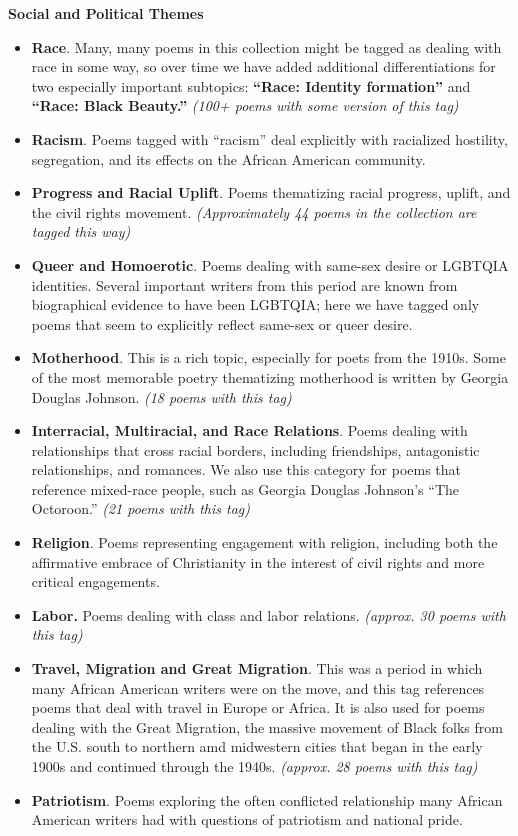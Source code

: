 \documentclass[
  letterpaper,
  DIV=11,
  numbers=noendperiod]{scrartcl}
\providecommand{\tightlist}{%
  \setlength{\itemsep}{0pt}\setlength{\parskip}{0pt}}\usepackage{longtable,booktabs,array}
\begin{document}
\textbf{Social and Political Themes}

\begin{itemize}
\tightlist
\item
  \textbf{Race}. Many, many poems in this collection might be tagged as
  dealing with race in some way, so over time we have added additional
  differentiations for two especially important subtopics:
  \textbf{``Race: Identity formation''} and \textbf{``Race: Black
  Beauty.''} \emph{(100+ poems with some version of this tag)}
\item
  \textbf{Racism}. Poems tagged with ``racism'' deal explicitly with
  racialized hostility, segregation, and its effects on the African
  American community.
\item
  \textbf{Progress and Racial Uplift}. Poems thematizing racial
  progress, uplift, and the civil rights movement. \emph{(Approximately
  44 poems in the collection are tagged this way)}
\item
  \textbf{Queer and Homoerotic}. Poems dealing with same-sex desire or
  LGBTQIA identities. Several important writers from this period are
  known from biographical evidence to have been LGBTQIA; here we have
  tagged only poems that seem to explicitly reflect same-sex or queer
  desire.
\item
  \textbf{Motherhood}. This is a rich topic, especially for poets from
  the 1910s. Some of the most memorable poetry thematizing motherhood is
  written by Georgia Douglas Johnson. \emph{(18 poems with this tag)}
\item
  \textbf{Interracial, Multiracial, and Race Relations}. Poems dealing
  with relationships that cross racial borders, including friendships,
  antagonistic relationships, and romances. We also use this category
  for poems that reference mixed-race people, such as Georgia Douglas
  Johnson's ``The Octoroon.'' \emph{(21 poems with this tag)}
\item
  \textbf{Religion}. Poems representing engagement with religion,
  including both the affirmative embrace of Christianity in the interest
  of civil rights and more critical engagements.
\item
  \textbf{Labor. }Poems dealing with class and labor relations.
  \emph{(approx. 30 poems with this tag)}
\item
  \textbf{Travel, Migration and Great Migration}. This was a period in
  which many African American writers were on the move, and this tag
  references poems that deal with travel in Europe or Africa. It is also
  used for poems dealing with the Great Migration, the massive movement
  of Black folks from the U.S. south to northern amd midwestern cities
  that began in the early 1900s and continued through the 1940s.
  \emph{(approx. 28 poems with this tag)}
\item
  \textbf{Patriotism}. Poems exploring the often conflicted relationship
  many African American writers had with questions of patriotism and
  national pride.
\end{itemize}
\end{document}
